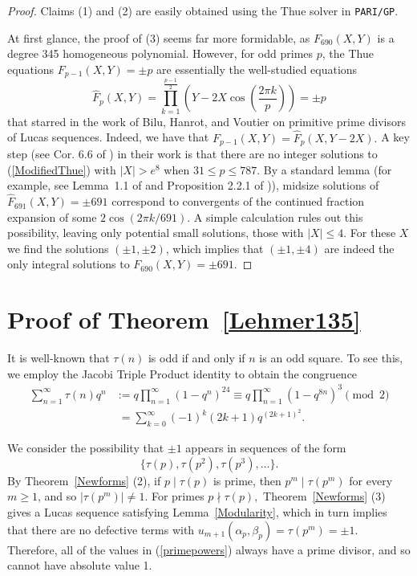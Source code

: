 \documentclass[12pt]{amsart}
\numberwithin{equation}{section}
\begin{document}
\begin{proof} Claims (1) and (2) are easily obtained using the Thue solver in \texttt{PARI/GP}.

At first glance, the proof of (3) seems far more formidable, as $F_{690}(X,Y)$ is a degree 345 homogeneous polynomial.
However, for odd primes $p$, the Thue equations $F_{p-1}(X,Y)=\pm p$
 are essentially the well-studied equations
\begin{equation}\label{ModifiedThue}
\widehat{F}_p(X,Y)=\prod_{k=1}^{\frac{p-1}{2}}\left(Y-2X\cos\left(\frac{2\pi k}{p}\right)\right)=\pm p
\end{equation}
that starred in the work of Bilu, Hanrot, and Voutier on primitive prime divisors of Lucas sequences. 
Indeed, we have that $F_{p-1}(X,Y)=\widehat{F}_p(X,Y-2X).$
A key step 
(see Cor. 6.6 of \cite{BHV}) in their work is that  there are no integer solutions to (\ref{ModifiedThue})
with $|X|>e^8$  when $31\leq p\leq 787.$ By a standard lemma (for example, see Lemma~1.1 of \cite{TW} and Proposition 2.2.1 of \cite{BH96})), midsize solutions of $\widehat{F}_{691}(X,Y)=\pm 691$  correspond to convergents of the continued fraction expansion of some
$2\cos(2\pi k/691).$  A simple calculation rules out this possibility, leaving only potential small solutions, those  with
 $|X|\leq 4$.  For these $X$ we find the solutions $(\pm 1, \pm 2)$, which implies that
$(\pm 1, \pm 4)$ are  indeed the only integral solutions to $F_{690}(X,Y)=\pm 691.$
\end{proof}

\section{Proof of Theorem~\ref{Lehmer135}}
It is well-known that $\tau(n)$ is odd if and only if $n$ is an odd square. 
To see this, we employ 
 the Jacobi Triple Product identity to obtain the congruence
\begin{displaymath}
\begin{split}
\sum_{n=1}^{\infty}\tau(n)q^n
&:=q\prod_{n=1}^{\infty}(1-q^n)^{24}
\equiv q\prod_{n=1}^{\infty}(1-q^{8n})^3\pmod 2\\
&\;=\sum_{k=0}^{\infty} (-1)^k(2k+1)q^{(2k+1)^2}.
\end{split}
\end{displaymath}

We consider the possibility that $\pm 1$ appears in sequences of the form
\begin{equation}\label{primepowers}
\{\tau(p),\tau(p^2), \tau(p^3),\dots\}.
\end{equation}
By Theorem~\ref{Newforms} (2), if  $p\mid \tau(p)$ is prime, then $p^m\mid \tau(p^m)$ for every $m\geq 1$, and
so $|\tau(p^m)|\neq 1.$  
For primes
$p\nmid \tau(p),$ Theorem~\ref{Newforms} (3) gives a Lucas sequence 
satisfying Lemma~\ref{Modularity}, which in turn implies that there are no defective terms with
$u_{m+1}(\alpha_p,\beta_p)=\tau(p^m)=\pm 1$. Therefore,
all of the values in (\ref{primepowers}) always have a prime divisor, and so cannot have absolute value 1.
\end{document}
